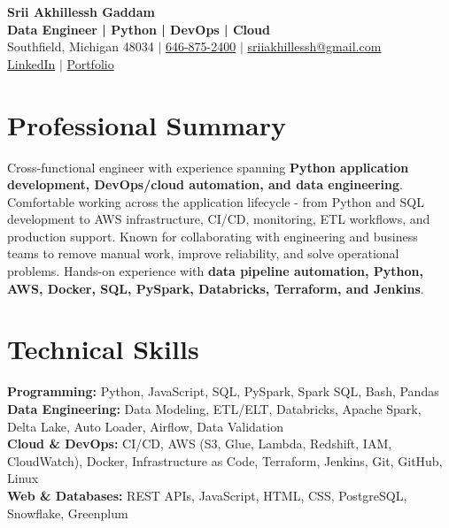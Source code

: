 \documentclass[letterpaper,10pt]{article}
\begin{document}
\fontsize{9.35pt}{10.45pt}\selectfont

\begin{center}
    {\LARGE \textbf{Srii Akhillessh Gaddam}} \\[-1pt]
    \textbf{Data Engineer | Python | DevOps | Cloud} \\[2pt]
    Southfield, Michigan 48034 $|$
    \href{tel:6468752400}{646-875-2400} $|$
    \href{mailto:sriiakhillessh@gmail.com}{sriiakhillessh@gmail.com} \\[1pt]
    \href{https://www.linkedin.com/in/srii-akhiilessh-gaddam-b48668191/}{LinkedIn} $|$
    \href{https://sriiakhillesshg.github.io/portfolio/}{Portfolio}
\end{center}
\vspace{-8pt}

\section{Professional Summary}
\small{Cross-functional engineer with experience spanning \textbf{Python application development, DevOps/cloud automation, and data engineering}. Comfortable working across the application lifecycle - from Python and SQL development to AWS infrastructure, CI/CD, monitoring, ETL workflows, and production support. Known for collaborating with engineering and business teams to remove manual work, improve reliability, and solve operational problems. Hands-on experience with \textbf{data pipeline automation, Python, AWS, Docker, SQL, PySpark, Databricks, Terraform, and Jenkins}.}

\section{Technical Skills}
\small{
\textbf{Programming:} Python, JavaScript, SQL, PySpark, Spark SQL, Bash, Pandas \\
\textbf{Data Engineering:} Data Modeling, ETL/ELT, Databricks, Apache Spark, Delta Lake, Auto Loader, Airflow, Data Validation \\
\textbf{Cloud \& DevOps:} CI/CD, AWS (S3, Glue, Lambda, Redshift, IAM, CloudWatch), Docker, Infrastructure as Code, Terraform, Jenkins, Git, GitHub, Linux \\
\textbf{Web \& Databases:} REST APIs, JavaScript, HTML, CSS, PostgreSQL, Snowflake, Greenplum
}
\end{document}
